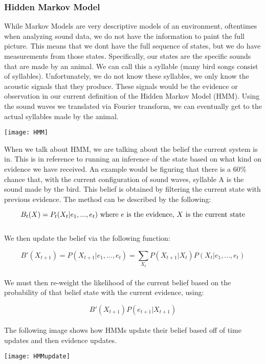 \subsubsection{Hidden Markov Model}
While Markov Models are very descriptive models of an environment, oftentimes when analyzing sound data, we do not have the information to paint the full picture. This means that we don\textquotesingle t have the full sequence of states, but we do have measurements from those states. Specifically, our states are the specific sounds that are made by an animal. We can call this a syllable (many bird songs consist of syllables). Unfortunately, we do not know these syllables, we only know the acoustic signals that they produce. These signals would be the evidence or observation in our current definition of the Hidden Markov Model (HMM). Using the sound waves we translated via Fourier transform, we can eventually get to the actual syllables made by the animal.\par

\begin{center}
  \texttt{[image: HMM]}
\end{center}

When we talk about HMM, we are talking about the belief the current system is in. This is in reference to running an inference of the state based on what kind on evidence we have received. An example would be figuring that there is a 60\% chance that, with the current configuration of sound waves, syllable A is the sound made by the bird. This belief is obtained by filtering the current state with previous evidence. The method can be described by the following:\par

\begin{equation}
  B_{t}(X)
  = P_{t}(X_{t} | e_{1}, ..., e_{t})
  \textnormal{ where } e \textnormal{ is the evidence, }
  X \textnormal{ is the current state}
\end{equation} \\[\eqnspace]

We then update the belief via the following function:\par

\begin{equation}
  B'(X_{t+1})
  = P(X_{t+1} | e_{1}, ..., e_{t})
  = \sum_{X_{t}} P(X_{t+1} | X_{t}) P(X_{t} | e_{1}, ..., e_{t})
\end{equation} \\[\eqnspace]

We must then re-weight the likelihood of the current belief based on the probability of that belief state with the current evidence, using:

\begin{equation}
  B'(X_{t+1}) P(e_{t+1} | X_{t+1})
\end{equation} \\[\eqnspace]

The following image shows how HMM\textquotesingle s update their belief based off of time updates and then evidence updates.

\begin{center}
  \texttt{[image: HMMupdate]}
\end{center}

